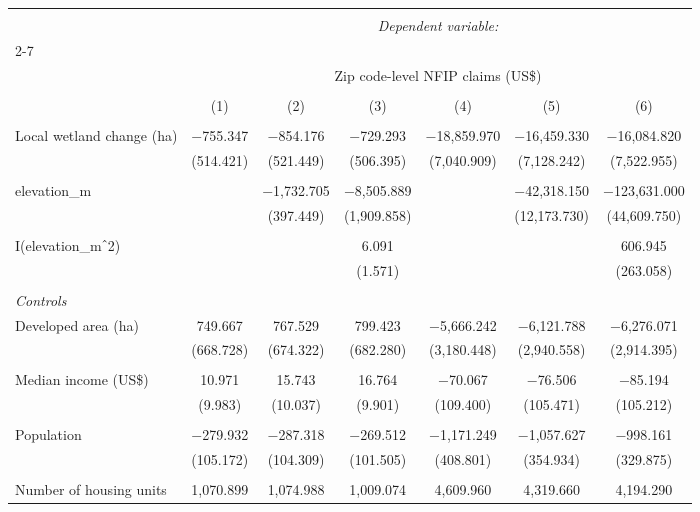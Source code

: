 \begin{tabular}{@{\extracolsep{5pt}}lcccccc} 
\\[-1.8ex]\hline 
\hline \\[-1.8ex] 
 & \multicolumn{6}{c}{\textit{Dependent variable:}} \\ 
\cline{2-7} 
\\[-1.8ex] & \multicolumn{6}{c}{Zip code-level NFIP claims (US\$)} \\ 
\\[-1.8ex] & (1) & (2) & (3) & (4) & (5) & (6)\\ 
\hline \\[-1.8ex] 
 Local wetland change (ha) & $-$755.347 & $-$854.176 & $-$729.293 & $-$18,859.970 & $-$16,459.330 & $-$16,084.820 \\ 
  & (514.421) & (521.449) & (506.395) & (7,040.909) & (7,128.242) & (7,522.955) \\ 
  & & & & & & \\ 
 elevation\_m &  & $-$1,732.705 & $-$8,505.889 &  & $-$42,318.150 & $-$123,631.000 \\ 
  &  & (397.449) & (1,909.858) &  & (12,173.730) & (44,609.750) \\ 
  & & & & & & \\ 
 I(elevation\_m$\hat{\mkern6mu}$2) &  &  & 6.091 &  &  & 606.945 \\ 
  &  &  & (1.571) &  &  & (263.058) \\ 
  & & & & & & \\ 
 \emph{Controls} \\ Developed area (ha) & 749.667 & 767.529 & 799.423 & $-$5,666.242 & $-$6,121.788 & $-$6,276.071 \\ 
  & (668.728) & (674.322) & (682.280) & (3,180.448) & (2,940.558) & (2,914.395) \\ 
  & & & & & & \\ 
 Median income (US\$) & 10.971 & 15.743 & 16.764 & $-$70.067 & $-$76.506 & $-$85.194 \\ 
  & (9.983) & (10.037) & (9.901) & (109.400) & (105.471) & (105.212) \\ 
  & & & & & & \\ 
 Population & $-$279.932 & $-$287.318 & $-$269.512 & $-$1,171.249 & $-$1,057.627 & $-$998.161 \\ 
  & (105.172) & (104.309) & (101.505) & (408.801) & (354.934) & (329.875) \\ 
  & & & & & & \\ 
 Number of housing units & 1,070.899 & 1,074.988 & 1,009.074 & 4,609.960 & 4,319.660 & 4,194.290 \\ 

\end{tabular}
